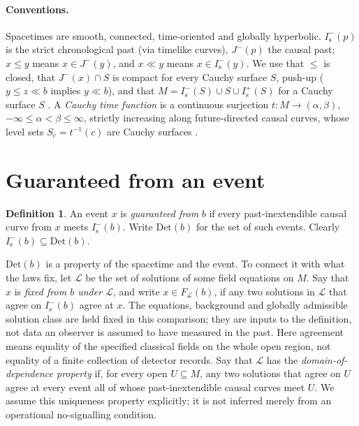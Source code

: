 \documentclass[11pt]{article}
\theoremstyle{definition}
\newtheorem{definition}[theorem]{Definition}
\newcommand{\Is}{I^-_{\mathrm s}}
\newcommand{\Isp}{I^+_{\mathrm s}}
\newcommand{\Det}{\mathrm{Det}}
\begin{document}
\paragraph{Conventions.} Spacetimes are smooth, connected, time-oriented and
globally hyperbolic. $\Is(p)$ is the strict chronological past (via timelike
curves), $J^-(p)$ the causal past; $x\le y$ means $x\in J^-(y)$, and $x\ll y$
means $x\in\Is(y)$. We use that $\le$ is closed, that $J^-(x)\cap S$ is
compact for every Cauchy surface $S$, push-up ($y\le z\ll b$ implies $y\ll b$),
and that $M=\Is(S)\cup S\cup\Isp(S)$ for a Cauchy surface $S$ \citep{MS2008}.
A \emph{Cauchy time function} is a continuous surjection $t:M\to(\alpha,\beta)$,
$-\infty\le\alpha<\beta\le\infty$, strictly increasing along future-directed
causal curves, whose level sets $S_c=t^{-1}(c)$ are Cauchy surfaces
\citep{BS2005}.

\section{Guaranteed from an event}\label{sec:det}

\begin{definition}
An event $x$ is \emph{guaranteed from} $b$ if every past-inextendible causal
curve from $x$ meets $\Is(b)$. Write $\Det(b)$ for the set of such events.
Clearly $\Is(b)\subseteq\Det(b)$.
\end{definition}

$\Det(b)$ is a property of the spacetime and the event. To connect it with
what the laws fix, let $\mathcal L$ be the set of solutions of some field
equations on $M$. Say that $x$ is \emph{fixed from $b$ under $\mathcal L$},
and write $x\in F_{\mathcal L}(b)$, if any two solutions in $\mathcal L$ that
agree on $\Is(b)$ agree at $x$. The equations, background and globally
admissible solution class are held fixed in this comparison; they are inputs
to the definition, not data an observer is assumed to have measured in the
past. Here agreement means equality of the specified classical fields on the
whole open region, not equality of a finite collection of detector records.
Say that $\mathcal L$ has the
\emph{domain-of-dependence property} if, for every open $U\subseteq M$, any two
solutions that agree on $U$ agree at every event all of whose
past-inextendible causal curves meet $U$. We assume this uniqueness property
explicitly; it is not inferred merely from an operational no-signalling
condition.
\end{document}
